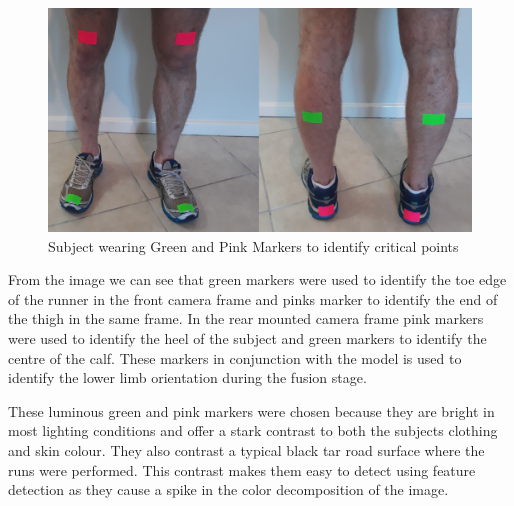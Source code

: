 \begin{figure}[!ht] 
\captionsetup{width=\linewidth, font=small}  
\includegraphics[width=\linewidth]{figures/markers.JPG}
\caption{Subject wearing Green and Pink Markers to identify critical points}
\label{fig:markers}
\end{figure}

From the image we can see that green markers were used to identify  the toe edge of the runner in the front camera frame and pinks marker to identify the end of the thigh in the same frame. In the rear mounted camera frame pink markers were used to identify the heel of the subject and green markers to identify the centre of the calf. These markers in conjunction with the model is used to identify the lower limb orientation during the fusion stage.

These luminous green and pink markers were chosen because they are bright in most lighting conditions and offer a stark contrast to both the subjects clothing and skin colour. They also contrast a typical black tar road surface where the runs were performed. This contrast makes them easy to detect using feature detection as they  cause a spike in the color decomposition of the image.




